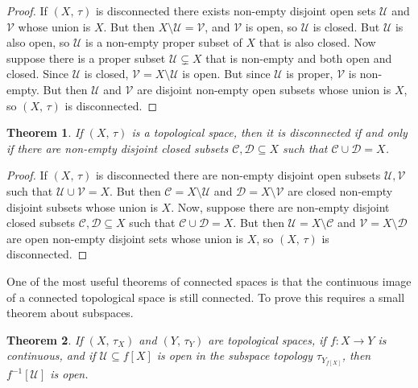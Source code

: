 \documentclass{article}
\theoremstyle{plain}
\newtheorem{theorem}{Theorem}[section]
\theoremstyle{normal}
\begin{document}
        \begin{proof}
            If $(X,\,\tau)$ is disconnected there exists non-empty disjoint
            open sets $\mathcal{U}$ and $\mathcal{V}$ whose union is $X$. But
            then $X\setminus\mathcal{U}=\mathcal{V}$, and $\mathcal{V}$ is
            open, so $\mathcal{U}$ is closed. But $\mathcal{U}$ is also open,
            so $\mathcal{U}$ is a non-empty proper subset of $X$ that is also
            closed. Now suppose there is a proper subset
            $\mathcal{U}\subsetneq{X}$
            that is non-empty and both open and closed. Since $\mathcal{U}$ is
            closed, $\mathcal{V}=X\setminus\mathcal{U}$ is open. But since
            $\mathcal{U}$ is proper, $\mathcal{V}$ is non-empty. But then
            $\mathcal{U}$ and $\mathcal{V}$ are disjoint non-empty open subsets
            whose union is $X$, so $(X,\,\tau)$ is disconnected.
        \end{proof}
        \begin{theorem}
            If $(X,\,\tau)$ is a topological space, then it is disconnected if
            and only if there are non-empty disjoint closed subsets
            $\mathcal{C},\mathcal{D}\subseteq{X}$ such that
            $\mathcal{C}\cup\mathcal{D}=X$.
        \end{theorem}
        \begin{proof}
            If $(X,\,\tau)$ is disconnected there are non-empty disjoint open
            subsets $\mathcal{U},\mathcal{V}$ such that
            $\mathcal{U}\cup\mathcal{V}=X$. But then
            $\mathcal{C}=X\setminus\mathcal{U}$ and
            $\mathcal{D}=X\setminus\mathcal{V}$ are closed non-empty disjoint
            subsets whose union is $X$. Now, suppose there are non-empty
            disjoint closed subsets $\mathcal{C},\mathcal{D}\subseteq{X}$ such
            that $\mathcal{C}\cup\mathcal{D}=X$. But then
            $\mathcal{U}=X\setminus\mathcal{C}$ and
            $\mathcal{V}=X\setminus\mathcal{D}$ are open non-empty disjoint
            sets whose union is $X$, so $(X,\,\tau)$ is disconnected.
        \end{proof}
        One of the most useful theorems of connected spaces is that the
        continuous image of a connected topological space is still connected.
        To prove this requires a small theorem about subspaces.
        \begin{theorem}
            If $(X,\,\tau_{X})$ and $(Y,\,\tau_{Y})$ are topological spaces,
            if $f:X\rightarrow{Y}$ is continuous, and if
            $\mathcal{U}\subseteq{f}[X]$ is open in the subspace topology
            $\tau_{Y_{f[X]}}$, then $f^{-1}[\mathcal{U}]$ is open.
        \end{theorem}
\end{document}
